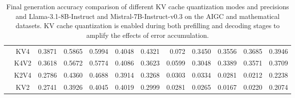 \begin{table}[ht]
{\begin{tabular}{ c c | r r r r r r r r r | r  }
& KV4 & 0.3871 & 0.5865 & 0.5994 & 0.4048 & 0.4321 & 0.072 & 0.3450 & 0.3556 & 0.3685 & 0.3946 \\
& K4V2 & 0.3618 & 0.5672 & 0.5774 & 0.4086 & 0.3623 & 0.0599 & 0.3048 & 0.3389 & 0.3571 & 0.3709 \\
& K2V4 & 0.2786 & 0.4360 & 0.4688 & 0.3914 & 0.3268 & 0.0303 & 0.0334 & 0.0281 & 0.0212 & \colorbox{blue!30}{0.2238} \\
& KV2 & 0.2741 & 0.3926 & 0.4045 & 0.4019 & 0.2999 & 0.0281 & 0.0265 & 0.0167 & 0.0220 & \colorbox{blue!30}{0.2074} \\
\bottomrule
\end{tabular}
}
\caption{Final generation accuracy comparison of different KV cache quantization modes and precisions and Llama-3.1-8B-Instruct and Mistral-7B-Instruct-v0.3 on the AIGC and mathematical datasets. KV cache quantization is enabled during both prefilling and decoding stages to amplify the effects of error accumulation.}
\label{tab:kvcache_quant_results_aigc_gsm8k_datasets_quant_modes_models_both_pd_enabled_kvquant_llama_mistral}
\end{table}

